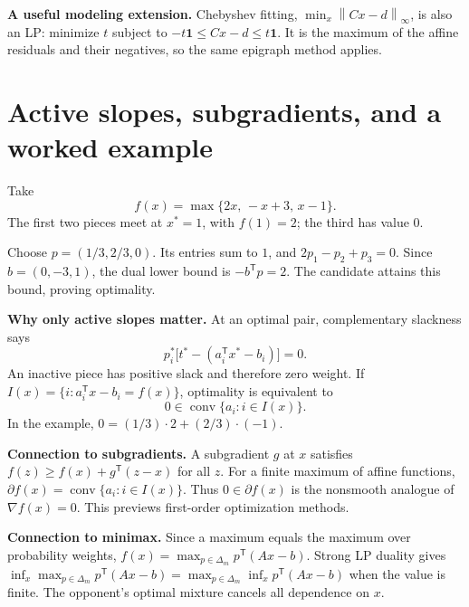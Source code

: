 \documentclass[11pt]{article}
\newcommand{\T}{^{\mathsf T}}
\newcommand{\ones}{\mathbf 1}
\newcommand{\conv}{\operatorname{conv}}
\newcommand{\norm}[1]{\left\lVert#1\right\rVert}
\begin{document}
\textbf{A useful modeling extension.} Chebyshev fitting,
$\min_x\norm{Cx-d}_\infty$, is also an LP: minimize $t$ subject to
$-t\ones\le Cx-d\le t\ones$. It is the maximum of the affine residuals
and their negatives, so the same epigraph method applies.

\newpage
\section{Active slopes, subgradients, and a worked example}
Take
\[
f(x)=\max\{2x,\,-x+3,\,x-1\}.
\]
The first two pieces meet at $x^*=1$, with $f(1)=2$; the third has value $0$.
\begin{center}
\end{center}
Choose $p=(1/3,2/3,0)$. Its entries sum to $1$, and
$2p_1-p_2+p_3=0$. Since $b=(0,-3,1)$, the dual lower bound is
$-b\T p=2$. The candidate attains this bound, proving optimality.

\textbf{Why only active slopes matter.} At an optimal pair, complementary
slackness says
\[
p_i^*\big[t^*-(a_i\T x^*-b_i)\big]=0.
\]
An inactive piece has positive slack and therefore zero weight.
If $I(x)=\{i:a_i\T x-b_i=f(x)\}$, optimality is equivalent to
\[
\boxed{0\in\conv\{a_i:i\in I(x)\}.}
\]
In the example, $0=(1/3)\cdot2+(2/3)\cdot(-1)$.

\textbf{Connection to subgradients.} A subgradient $g$ at $x$ satisfies
$f(z)\ge f(x)+g\T(z-x)$ for all $z$. For a finite maximum of affine
functions, $\partial f(x)=\conv\{a_i:i\in I(x)\}$.
Thus $0\in\partial f(x)$ is the nonsmooth analogue of $\nabla f(x)=0$.
This previews first-order optimization methods.

\textbf{Connection to minimax.} Since a maximum equals the maximum over
probability weights, $f(x)=\max_{p\in\Delta_m}p\T(Ax-b)$.
Strong LP duality gives $\inf_x\max_{p\in\Delta_m}p\T(Ax-b)
=\max_{p\in\Delta_m}\inf_x p\T(Ax-b)$ when the value is finite.
The opponent's optimal mixture cancels all dependence on $x$.
\end{document}
